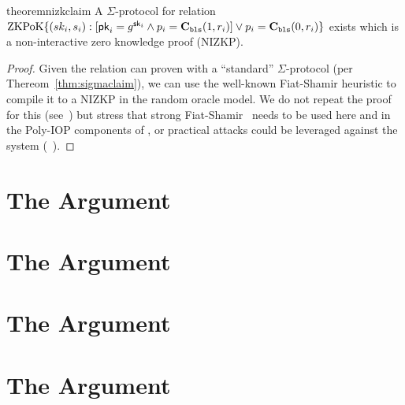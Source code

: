 
\begin{restatable}{theorem}{nizkclaim}
\label{thm:nizkclaim}
A $\Sigma$-protocol for relation $\mathrm{ZKPoK} \{ (sk_i,s_i) :  [\mathsf{pk}_i=g^{\mathsf{sk}_i} \land p_i=\textbf{C}_\texttt{bls}(1,r_i)  ] \lor p_i=\textbf{C}_\texttt{bls}(0,r_i) \}$ exists which is a non-interactive zero knowledge proof (NIZKP).
\end{restatable}

\begin{proof}
Given the relation can proven with a ``standard'' $\Sigma$-protocol (per Thereom~\ref{thm:sigmaclaim}), we can use the well-known Fiat-Shamir heuristic to compile it to a NIZKP in the random oracle model. We do not repeat the proof for this (see~\cite{damgard10,sigma}) but stress that strong Fiat-Shamir~\cite{weakfs} needs to be used here and in the Poly-IOP components of \Sys, or practical attacks could be leveraged against the system (\cf~\cite{weakfsattacks}).\end{proof}


\section{The \poa Argument}

\section{The \pol Argument}

\section{The \userproof Argument}

\section{The \pos Argument}

